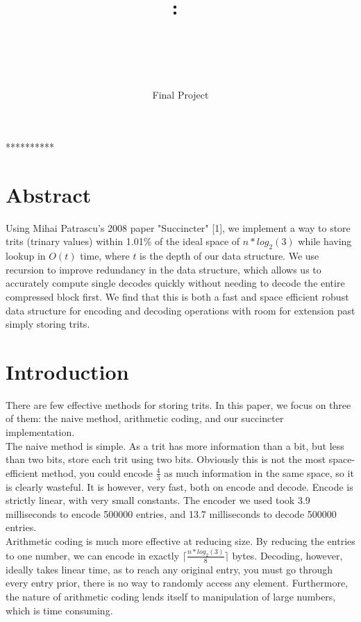 \documentclass{article}
\title{\textmd{\textbf{\Class:\ \Title}}\\\normalsize\vspace{0.1in}\small{ \Date}\\\vspace{0.1in}\large{\textit{\ClassInstructor\ \ClassTime}}}
\author{\textbf{\AuthorName}}
\date{Final Project}
\begin{document}
\maketitle


\bigskip
\centerline{**********}

\noindent \section{Abstract}
Using Mihai Patrascu's 2008 paper "Succincter" [1],  we implement a way to store trits (trinary values) within 1.01\% of the ideal space of $n*log_2(3)$ while having lookup in $O(t)$ time, where $t$ is the depth of our data structure. We use recursion to improve redundancy in the data structure, which allows us to accurately compute single decodes quickly without needing to decode the entire compressed block first. We find that this is both a fast and space efficient robust data structure for encoding and decoding operations with room for extension past simply storing trits.\\

\noindent \section{Introduction}

\indent There are few effective methods for storing trits. In this paper, we focus on three of them: the naive method, arithmetic coding, and our succincter implementation.\\

\indent The naive method is simple. As a trit has more information than a bit, but less than two bits, store each trit using two bits. Obviously this is not the most space-efficient method, you could encode $\frac{4}{3}$ as much information in the same space, so it is clearly wasteful. It is however, very fast, both on encode and decode. Encode is strictly linear, with very small constants. The encoder we used took 3.9 milliseconds to encode 500000 entries, and 13.7 milliseconds to decode 500000 entries.\\

\indent Arithmetic coding is much more effective at reducing size. By reducing the entries to one number, we can encode in exactly $\lceil \frac{n*log_2(3)}{8}\rceil$ bytes. Decoding, however, ideally takes linear time, as to reach any original entry, you must go through every entry prior, there is no way to randomly access any element. Furthermore, the nature of arithmetic coding lends itself to manipulation of large numbers, which is time consuming.\\
\end{document}
